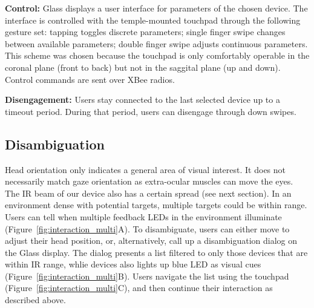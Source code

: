 {\bf Control:} Glass displays a user interface for parameters of the chosen device. The interface is controlled with the temple-mounted touchpad through the following gesture set: tapping toggles discrete parameters; single finger swipe changes between available parameters; double finger swipe adjusts continuous parameters. This scheme was chosen because the touchpad is only comfortably operable in the coronal plane (front to back) but not in the saggital plane (up and down). 
Control commands are sent over XBee radios.

{\bf Disengagement:} Users stay connected to the last selected device up to a timeout period. During that period, users can disengage through down swipes.

\subsection{Disambiguation}
Head orientation only indicates a general area of visual interest. It does not necessarily match gaze orientation as extra-ocular muscles can move the eyes. The IR beam of our device also has a certain spread (see next section). In an environment dense with potential targets, multiple targets could be within range. Users can tell when multiple feedback LEDs in the environment illuminate (Figure~\ref{fig:interaction_multi}A). To disambiguate, users can either move to adjust their head position, or, alternatively, call up a disambiguation dialog on the Glass display. The dialog presents a list filtered to only those devices that are within IR range, whlie devices also lights up blue LED as visual cues (Figure~\ref{fig:interaction_multi}B). Users navigate the list using the touchpad (Figure~\ref{fig:interaction_multi}C), and then continue their interaction as described above.
